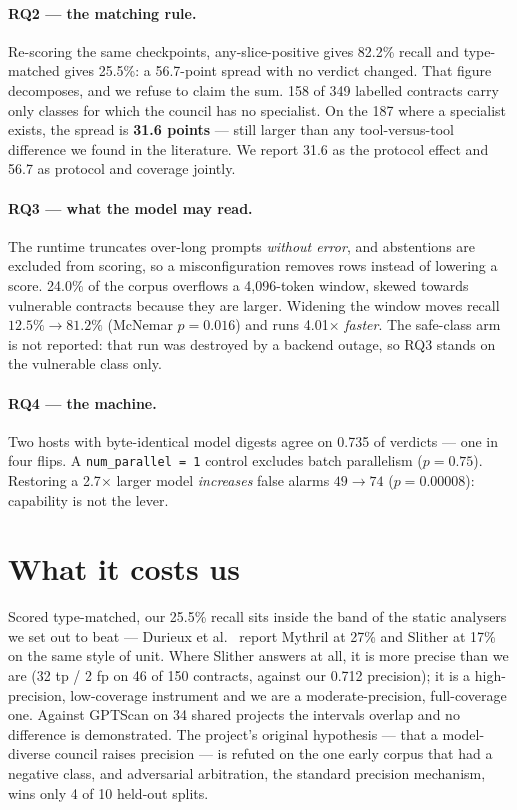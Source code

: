 \documentclass[sigconf,nonacm]{acmart}
\begin{document}
\paragraph{RQ2 --- the matching rule.}
Re-scoring the same checkpoints, any-slice-positive gives 82.2\% recall and
type-matched gives 25.5\%: a 56.7-point spread with no verdict changed. That
figure decomposes, and we refuse to claim the sum. 158 of 349 labelled contracts
carry only classes for which the council has no specialist. On the 187 where a
specialist exists, the spread is \textbf{31.6 points} --- still larger than any
tool-versus-tool difference we found in the literature. We report 31.6 as the
protocol effect and 56.7 as protocol and coverage jointly.

\paragraph{RQ3 --- what the model may read.}
The runtime truncates over-long prompts \emph{without error}, and abstentions are
excluded from scoring, so a misconfiguration removes rows instead of lowering a
score. 24.0\% of the corpus overflows a 4,096-token window, skewed towards
vulnerable contracts because they are larger. Widening the window moves recall
$12.5\% \rightarrow 81.2\%$ (McNemar $p = 0.016$) and runs 4.01$\times$
\emph{faster}. The safe-class arm is not reported: that run was destroyed by a
backend outage, so RQ3 stands on the vulnerable class only.

\paragraph{RQ4 --- the machine.}
Two hosts with byte-identical model digests agree on 0.735 of verdicts --- one in
four flips. A \texttt{num\_parallel = 1} control excludes batch parallelism
($p = 0.75$). Restoring a 2.7$\times$ larger model \emph{increases} false alarms
$49 \rightarrow 74$ ($p = 0.00008$): capability is not the lever.

\section{What it costs us}

Scored type-matched, our 25.5\% recall sits inside the band of the static
analysers we set out to beat --- Durieux et al.~\cite{durieux} report Mythril at
27\% and Slither at 17\% on the same style of unit. Where Slither answers at all,
it is more precise than we are (32 tp / 2 fp on 46 of 150 contracts, against our
0.712 precision); it is a high-precision, low-coverage instrument and we are a
moderate-precision, full-coverage one. Against GPTScan on 34 shared projects the
intervals overlap and no difference is demonstrated. The project's original
hypothesis --- that a model-diverse council raises precision --- is refuted on the
one early corpus that had a negative class, and adversarial arbitration, the
standard precision mechanism, wins only 4 of 10 held-out splits.
\end{document}

